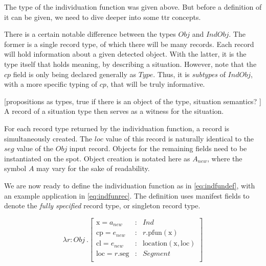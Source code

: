 \documentclass[11pt, a4paper]{article}
\begin{document}
The type of the individuation function was given above.
But before a definition of it can be given, we need to dive deeper into some \gls{ttr} concepts.

There is a certain notable difference between the types $Obj$ and $IndObj$.
The former is a single record type, of which there will be many records.
Each record will hold information about a given detected object.
With the latter, it is the type itself that holds meaning, by describing a situation.
However, note that the $cp$ field is only being declared generally as $Type$.
Thus, it is \textit{subtypes} of $IndObj$, with a more specific typing of $cp$, that will be truly informative.

[propositions as types, true if there is an object of the type, situation semantics? \cite{BarwiseSituationsAttitudes1981}]
A record of a situation type then serves as a witness for the situation.

For each record type returned by the individuation function, a record is simultaneously created.
The $loc$ value of this record is naturally identical to the $seg$ value of the $Obj$ input record.
Objects for the remaining fields need to be instantiated on the spot.
Object creation is notated here as $A_{new}$, where the symbol $A$ may vary for the sake of readability.

We are now ready to define the individuation function as in \autoref{eq:indfundef}, with an example application in \autoref{eq:indfunrec}.
The definition uses manifest fields to denote the \textit{fully specified} record type, or singleton record type.

\begin{equation}\label{eq:indfundef}
\lambda r : Obj\ . \left[\begin{array}{lcl}
    \text{x} = a_{new} &:& Ind \\
    \text{cp} = e_{new} &:& r.\text{pfun}(\text{x}) \\
    \text{cl} = e_{new} &:& \text{location}(\text{x}, \text{loc}) \\
    \text{loc} = r.\text{seg} &:& Segment\\
\end{array}\right]
\end{equation}
\end{document}
